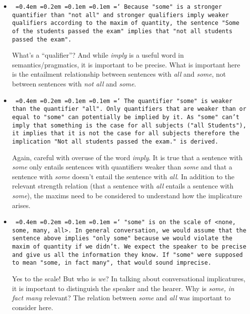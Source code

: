 \documentclass[a4,11pt]{article}
\newcommand*\justify{%
  \fontdimen2\font=0.4em%
  \fontdimen3\font=0.2em%
  \fontdimen4\font=0.1em%
  \fontdimen7\font=0.1em%
  \hyphenchar\font=`\-%
}
\begin{document}
\begin{itemize}[leftmargin = 12pt]
\item \texttt{\justify Because "some" is a stronger quantifier than "not all" and stronger qualifiers imply weaker qualifiers according to the maxim of quantity, the sentence "Some of the students passed the exam" implies that "not all students passed the exam".}

What's a ``qualifier''? And while {\em imply} is a useful word in semantics/pragmatics, it is important to be precise. What is important here is the entailment relationship between sentences with {\em all} and {\em some}, not between sentences with {\em not all} and {\em some}. 

\item \texttt{\justify The quantifier "some" is weaker than the quantifier "all". Only quantifiers that are weaker than or equal to "some" can potentially be implied by it. As "some" can't imply that something is the case for all subjects ("all Students"), it implies that it is not the case for all subjects therefore the implication "Not all students passed the exam." is derived.}

Again, careful with overuse of the word {\em imply}. It is true that a sentence with {\em some} only entails sentences with quantifiers weaker than {\em some} and that a sentence with {\em some} doesn't entail the sentence with {\em all}. In addition to the relevant strength relation (that a sentence with {\em all} entails a sentence with {\em some}), the maxims need to be considered to understand how the implicature arises.

\item \texttt{\justify "some" is on the scale of <none, some, many, all>. In general conversation, we would assume that the sentence above implies "only some" because we would violate the maxim of quantity if we didn't. We expect the speaker to be precise and give us all the information they know. If "some" were supposed to mean "some, in fact many", that would sound imprecise.}

Yes to the scale! But who is {\em we}? In talking about conversational implicatures, it is important to distinguish the speaker and the hearer. Why is {\em some, in fact many} relevant? The relation between {\em some} and {\em all} was important to consider here.


\end{itemize}
\end{document}
